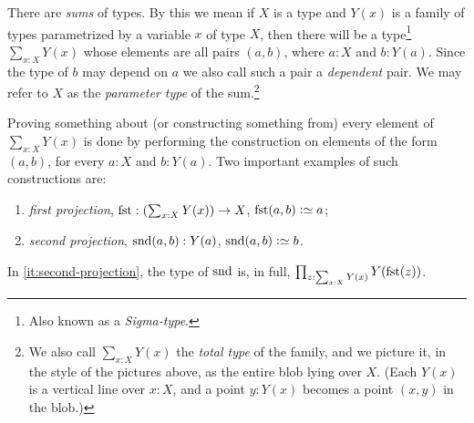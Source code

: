 There are \emph{sums} of types.
By this we mean if $X$ is a type and $Y(x)$ is a family of types parametrized by a variable $x$ of type $X$, then
there will be a type\footnote{%
  Also known as a \emph{Sigma-type}.}
$\sum _{x:X} Y(x)$ whose elements are all pairs $(a,b)$, where $a:X$ and $b:Y(a)$. Since the type of $b$ may depend on $a$ we also call such a pair
a \emph{dependent} pair. We may refer to $X$ as the \emph{parameter
  type} of the sum.\footnote{%
  We also call $\sum_{x:X}Y(x)$ the \emph{total type} of the family,
  and we picture it, in the style of the pictures above,
  as the entire blob lying over $X$. (Each $Y(x)$ is a vertical line over $x:X$,
  and a point $y:Y(x)$ becomes a point $(x,y)$ in the blob.)\par
  }

Proving something about (or constructing something from) every
element of $\sum _{x:X} Y(x)$ is done by performing the construction on elements of the form $(a,b)$, for every $a:X$ and $b: Y(a)$.
Two important examples of such constructions are:
\begin{enumerate}
\item \emph{first projection},
$\fst:(\sum _{x:X} Y(x)) \to X$,
$\fst(a,b)\defeq a$;
\item\label{it:second-projection} \emph{second projection},
$\snd(a,b): Y(a)$,
$\snd(a,b)\defeq b$.
\end{enumerate}
In \ref{it:second-projection}, the type of $\snd$ is, in full,
$\prod_{z:\sum_{x:X} Y(x)} Y(\fst(z))$.

